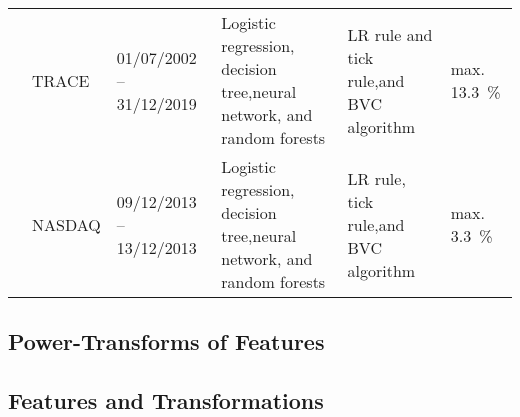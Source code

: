 \begin{landscape}
\begin{table}[ht]
\begin{tabular}{@{}p{3cm}p{3cm}lp{4cm}p{4cm}l@{}}
            \autocite[][49--57]{ronenMachineLearningTrade2022}            & \gls{TRACE}                       & 01/07/2002 -- 31/12/2019 & Logistic regression, decision tree,\newline neural network, and random forests                         & \gls{LR} rule and tick rule,\newline and \gls{BVC} algorithm & max. \SI{13.3}{\percent} \\ \cmidrule{2-6}
                                                                          & \gls{NASDAQ}                      & 09/12/2013 -- 13/12/2013 & Logistic regression, decision tree,\newline neural network, and random forests                         & \gls{LR} rule, tick rule,\newline and \gls{BVC} algorithm    & max. \SI{3.3}{\percent}  \\ \bottomrule
        \end{tabular}
    \end{table}
\end{landscape}


\subsection{Power-Transforms of Features}
\label{app:power-transforms-of-features}

\subsection{Features and Transformations}
\label{app:feature-and-transformations}

